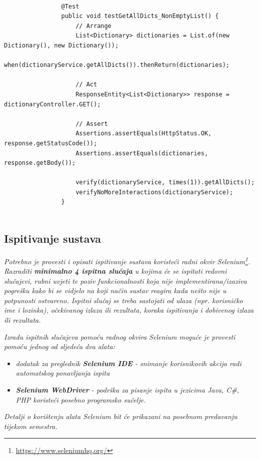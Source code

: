			\begin{lstlisting}
				
				@Test
				public void testGetAllDicts_NonEmptyList() {
					// Arrange
					List<Dictionary> dictionaries = List.of(new Dictionary(), new Dictionary());
					when(dictionaryService.getAllDicts()).thenReturn(dictionaries);
					
					// Act
					ResponseEntity<List<Dictionary>> response = dictionaryController.GET();
					
					// Assert
					Assertions.assertEquals(HttpStatus.OK, response.getStatusCode());
					Assertions.assertEquals(dictionaries, response.getBody());
					
					verify(dictionaryService, times(1)).getAllDicts();
					verifyNoMoreInteractions(dictionaryService);
				}
				
			\end{lstlisting}

			\subsection{Ispitivanje sustava}
			
			 \textit{Potrebno je provesti i opisati ispitivanje sustava koristeći radni okvir Selenium\footnote{\url{https://www.seleniumhq.org/}}. Razraditi \textbf{minimalno 4 ispitna slučaja} u kojima će se ispitati redovni slučajevi, rubni uvjeti te poziv funkcionalnosti koja nije implementirana/izaziva pogrešku kako bi se vidjelo na koji način sustav reagira kada nešto nije u potpunosti ostvareno. Ispitni slučaj se treba sastojati od ulaza (npr. korisničko ime i lozinka), očekivanog izlaza ili rezultata, koraka ispitivanja i dobivenog izlaza ili rezultata.\\ }
			 
			 \textit{Izradu ispitnih slučajeva pomoću radnog okvira Selenium moguće je provesti pomoću jednog od sljedeća dva alata:}
			 \begin{itemize}
			 	\item \textit{dodatak za preglednik \textbf{Selenium IDE} - snimanje korisnikovih akcija radi automatskog ponavljanja ispita	}
			 	\item \textit{\textbf{Selenium WebDriver} - podrška za pisanje ispita u jezicima Java, C\#, PHP koristeći posebno programsko sučelje.}
			 \end{itemize}
		 	\textit{Detalji o korištenju alata Selenium bit će prikazani na posebnom predavanju tijekom semestra.}
			
